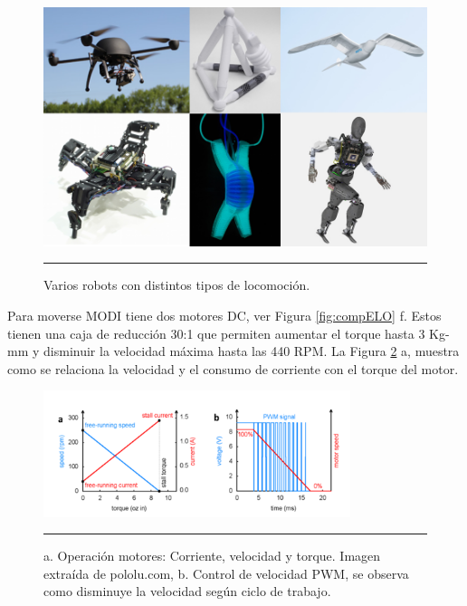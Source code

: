 \begin{figure}[htbp]
	\centering
		\includegraphics[width=\textwidth]{./Figures/robots.png}
		\rule{35em}{0.5pt}
	\caption[Robots]{Varios robots con distintos tipos de locomoción.}
	\label{fig:Atlas}
\end{figure}


Para moverse MODI tiene dos motores DC, ver Figura \ref{fig:compELO} f. Estos tienen una caja de reducción 30:1 que permiten aumentar el torque hasta 3 Kg-mm y disminuir la velocidad máxima hasta las 440 RPM. La Figura \ref{fig:DCMotor} a, muestra como se relaciona la velocidad y el consumo de corriente con el torque del motor.

\begin{figure}[htbp]
	\centering
		\includegraphics[width=0.8\textwidth]{./Figures/graficosMotores.png}
		\rule{35em}{0.5pt}
	\caption[Gráficos Motor DC]{a. Operación motores: Corriente, velocidad y torque. Imagen extraída de pololu.com, b. Control de velocidad PWM, se observa como disminuye la velocidad según ciclo de trabajo.}
	\label{fig:DCMotor}
\end{figure}

